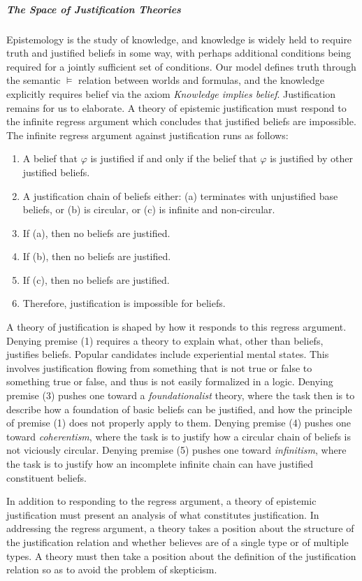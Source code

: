 \subparagraph{The Space of Justification Theories}
Epistemology is the study of knowledge, and knowledge is widely held to require truth and justified beliefs in some way, with perhaps additional conditions being required for a jointly sufficient set of conditions. Our model defines truth through the semantic $\models$ relation between worlds and formulas, and the knowledge explicitly requires belief via the axiom \emph{Knowledge implies belief}. Justification remains for us to elaborate. A theory of epistemic justification must respond to the infinite regress argument which concludes that justified beliefs are impossible. The infinite regress argument against justification runs as follows:
\begin{enumerate}
	\item A belief that $\varphi$ is justified if and only if the belief that $\varphi$ is justified by other justified beliefs.
	\item A justification chain of beliefs either: (a) terminates with unjustified base beliefs, or (b) is circular, or (c) is infinite and non-circular.
	\item If (a), then no beliefs are justified.
	\item If (b), then no beliefs are justified.
	\item If (c), then no beliefs are justified.
	\item Therefore, justification is impossible for beliefs.
\end{enumerate}
A theory of justification is shaped by how it responds to this regress argument. Denying premise (1) requires a theory to explain what, other than beliefs, justifies beliefs. Popular candidates include experiential mental states. This involves justification flowing from something that is not true or false to something true or false, and thus is not easily formalized in a logic. Denying premise (3) pushes one toward a \emph{foundationalist} theory, where the task then is to describe how a foundation of basic beliefs can be justified, and how the principle of premise (1) does not properly apply to them. Denying premise (4) pushes one toward \emph{coherentism}, where the task is to justify how a circular chain of beliefs is not viciously circular. Denying premise (5) pushes one toward \emph{infinitism}, where the task is to justify how an incomplete infinite chain can have justified constituent beliefs.

In addition to responding to the regress argument, a theory of epistemic justification must present an analysis of what constitutes justification. In addressing the regress argument, a theory takes a position about the structure of the justification relation and whether believes are of a single type or of multiple types. A theory must then take a position about the definition of the justification relation so as to avoid the problem of skepticism.


